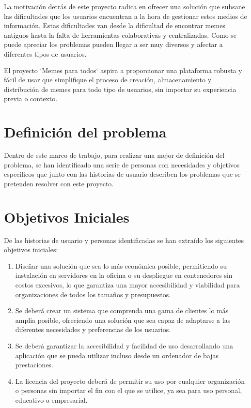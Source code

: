 La motivación detrás de este proyecto radica en ofrecer una solución que subsane las dificultades que los usuarios encuentran a la hora de gestionar estos medios de información. Estas dificultades van desde la dificultad de encontrar memes antiguos hasta la falta de herramientas colaborativas y centralizadas. Como se puede apreciar los problemas pueden llegar a ser muy diversos y afectar a diferentes tipos de usuarios.

El proyecto `Memes para todos` aspira a proporcionar una plataforma robusta y fácil de usar que simplifique el proceso de creación, almacenamiento y distribución de memes para todo tipo de usuarios, sin importar su experiencia previa o contexto.

\section{Definición del problema}

Dentro de este marco de trabajo, para realizar una mejor de definición del problema, se han identificado una serie de personas con necesidades y objetivos específicos que junto con las historias de usuario describen los problemas que se pretenden resolver con este proyecto.

\section{Objetivos Iniciales}

De las historias de usuario y personas identificadas se han extraído los siguientes objetivos iniciales:

\begin{enumerate}
    \item Diseñar una solución que sea lo más económica posible, permitiendo su instalación en servidores en la oficina o su despliegue en contenedores sin costos excesivos, lo que garantiza una mayor accesibilidad y viabilidad para organizaciones de todos los tamaños y presupuestos.
    \item Se deberá crear un sistema que comprenda una gama de clientes lo más amplia posible, ofreciendo una solución que sea capaz de adaptarse a las diferentes necesidades y preferencias de los usuarios.
    \item Se deberá garantizar la accesibilidad y facilidad de uso desarrollando una aplicación que se pueda utilizar incluso desde un ordenador de bajas prestaciones.
    \item La licencia del proyecto deberá de permitir su uso por cualquier organización o personas sin importar el fin con el que se utilice, ya sea para uso personal, educativo o empresarial.
\end{enumerate}
